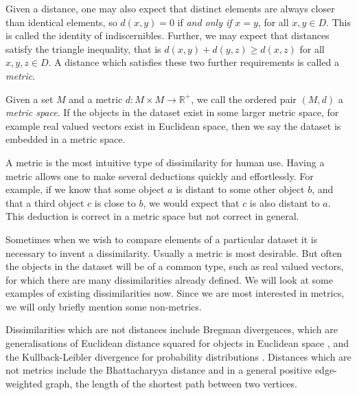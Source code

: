\documentclass[a4paper]{report}
\newcommand{\dset}{D}
\begin{document}
Given a distance, one may also expect that distinct elements are always closer
than identical elements, so $d(x,y)=0$ if \textit{and only if} $x=y$, for all
$x,y \in \dset$.  This is called the identity of indiscernibles.  Further, we
may expect that distances satisfy the triangle inequality, that is
$d(x,y)+d(y,z) \geq d(x,z)$ for all $x,y,z \in \dset$.  A distance which
satisfies these two further requirements is called a \textit{metric}.

Given a set $M$ and a metric $d \colon M \times M \to \mathbb{R}^+$, we call
the ordered pair $(M,d)$ a \textit{metric space}.  If the objects in the
dataset exist in some larger metric space, for example real valued vectors
exist in Euclidean space, then we say the dataset is embedded in a metric
space.

A metric is the most intuitive type of dissimilarity for human use.  Having a
metric allows one to make several deductions quickly and effortlessly.  For
example, if we know that some object $a$ is distant to some other object $b$,
and that a third object $c$ is close to $b$, we would expect that $c$ is also
distant to $a$.  This deduction is correct in a metric space but not correct
in general.

Sometimes when we wish to compare elements of a particular dataset it is
necessary to invent a dissimilarity.  Usually a metric is most desirable.  But
often the objects in the dataset will be of a common type, such as real valued
vectors, for which there are many dissimilarities already defined.  We will
look at some examples of existing dissimilarities now.  Since we are most
interested in metrics, we will only briefly mention some non-metrics.

Dissimilarities which are not distances include Bregman divergences, which are
generalisations of Euclidean distance squared for objects in Euclidean space
\citep{banerjee2005clustering}, and the Kullback-Leibler divergence for
probability distributions \citep{kullback68information}.  Distances which are
not metrics include the Bhattacharyya distance \citep{bhattacharyya43distance}
and in a general positive edge-weighted graph, the length of the shortest path
between two vertices.
\end{document}
